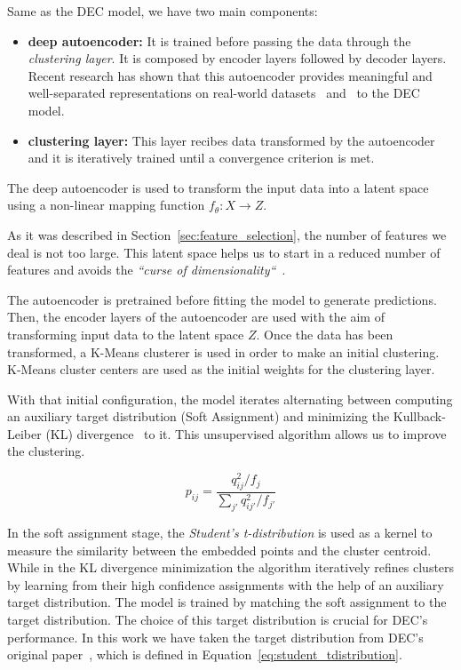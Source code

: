 \documentclass[11pt,a4paper,english,twocolumn]{article}
\begin{document}
Same as the DEC model, we have two main components:

\begin{itemize}
  \item \textbf{deep autoencoder:} It is trained before passing the data through the
        \emph{clustering layer}. It is composed by encoder layers followed by decoder
        layers. Recent research has shown that this autoencoder provides meaningful and
        well-separated representations on real-world datasets~\cite{vincent2010stacked}
        and~\cite{hinton2006reducing} to the DEC model.
  \item \textbf{clustering layer:} This layer recibes data transformed by the autoencoder
        and it is iteratively trained until a convergence criterion is met.
\end{itemize}

The deep autoencoder is used to transform the input data into a latent space using a
non-linear mapping function \(f_{\theta} : X \rightarrow Z\).

As it was described in Section~\ref{sec:feature_selection}, the number of features we
deal is not too large. This latent space helps us to start in a reduced number of
features and avoids the \emph{``curse of dimensionality``}~\cite{bellman1961curse}.

The autoencoder is pretrained before fitting the model to generate predictions. Then,
the encoder layers of the autoencoder are used with the aim of transforming input data to
the latent space \(Z\). Once the data has been transformed, a K-Means clusterer is used in
order to make an initial clustering. K-Means cluster centers are used as the initial
weights for the clustering layer.

With that initial configuration, the model iterates alternating between computing an auxiliary
target distribution (Soft Assignment) and minimizing the Kullback-Leiber (KL)
divergence~\cite{kullback1951information} to it.
This unsupervised algorithm allows us to improve the clustering.

\begin{equation}
  p_{ij} = \frac{q^{2}_{ij} / f_{j}}{\sum_{j'}q^{2}_{ij'}/f_{j'}}
  \label{eq:student_tdistribution}
\end{equation}

In the soft assignment stage,
the \emph{Student's t-distribution} is used as a kernel to measure the similarity
between the embedded points and the cluster centroid.
While in the KL divergence minimization the algorithm iteratively refines clusters by learning
from their high confidence assignments with the help of an auxiliary target distribution.
The model is trained by matching the soft assignment to the target distribution.
The choice of this target distribution is crucial for DEC's performance.
In this work we have taken the target distribution from DEC's original paper~\cite{xie2016unsupervised},
which is defined in Equation~\ref{eq:student_tdistribution}.
\end{document}
